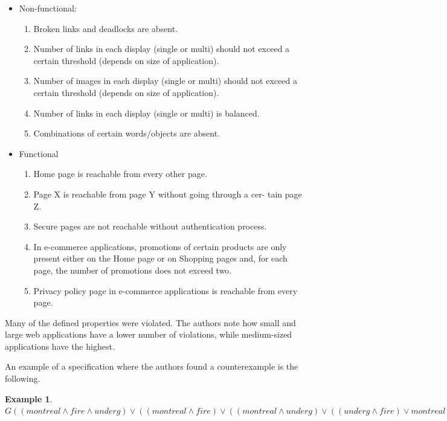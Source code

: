 \documentclass[a4paper,10pt]{article}
\theoremstyle{plain} %
\theoremstyle{definition}
\newtheorem{example}{Example}
\theoremstyle{remark}
\begin{document}
\begin{itemize}
  \item Non-functional:
    \begin{enumerate}
      \item Broken links and deadlocks are absent.
      \item Number of links in each display (single or multi) should not exceed a certain threshold (depends on size of application).
      \item Number of images in each display (single or multi) should not exceed a certain threshold (depends on size of application).
      \item Number of links in each display (single or multi) is balanced.
      \item Combinations of certain words/objects are absent.
    \end{enumerate}
  \item Functional
    \begin{enumerate}
      \item Home page is reachable from every other page.
      \item Page X is reachable from page Y without going through a cer- tain page Z.
      \item Secure pages are not reachable without authentication process.
      \item In e-commerce applications, promotions of certain products are only present either on the Home page or on Shopping pages and, for each page, the number of promotions does not exceed two.
      \item Privacy policy page in e-commerce applications is reachable from every page.
    \end{enumerate}
\end{itemize}

Many of the defined properties were violated. The authors note how small and large web applications have a lower number of violations, while medium-sized applications have the highest.

An example of a specification where the authors found a counterexample is the following.

\begin{example}
  \begin{math}
    G((montreal\land fire\land underg)\lor((montreal\land fire)\lor((montreal\land underg)\lor((underg\land fire)\lor montreal\lor underg\lor fire))))
  \end{math}
\end{example}
\end{document}
